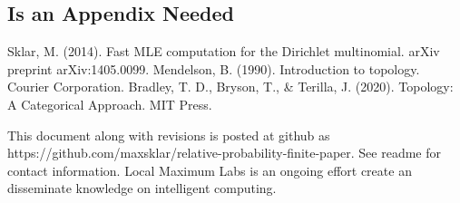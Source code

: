\documentclass[twoside]{article}
\begin{document}
\begin{appendices}

\section{Is an Appendix Needed}

\end{appendices}


\begin{thebibliography}{20}

Sklar, M. (2014). Fast MLE computation for the Dirichlet multinomial. arXiv preprint arXiv:1405.0099.
Mendelson, B. (1990). Introduction to topology. Courier Corporation.
Bradley, T. D., Bryson, T., \& Terilla, J. (2020). Topology: A Categorical Approach. MIT Press.

\end{thebibliography}

This document along with revisions is posted at github as https://github.com/maxsklar/relative-probability-finite-paper. See readme for contact information. Local Maximum Labs is an ongoing effort create an disseminate knowledge on intelligent computing.
\end{document}

